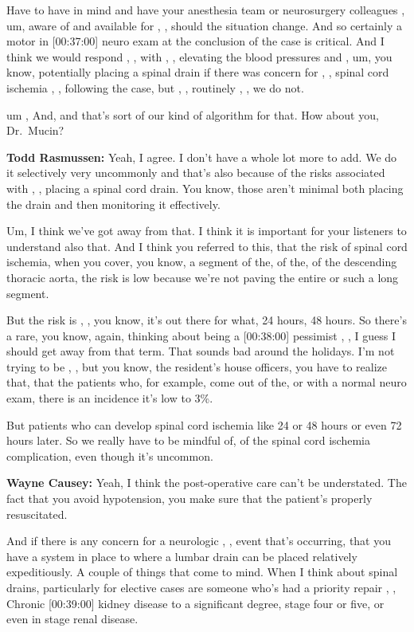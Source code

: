 \documentclass[
]{book}
\begin{document}
Have to have in mind and have your anesthesia team or neurosurgery
colleagues , um, aware of and available for , , should the situation
change. And so certainly a motor in {[}00:37:00{]} neuro exam at the
conclusion of the case is critical. And I think we would respond , ,
with , , elevating the blood pressures and , um, you know, potentially
placing a spinal drain if there was concern for , , spinal cord ischemia
, , following the case, but , , routinely , , we do not.

um , And, and that's sort of our kind of algorithm for that. How about
you, Dr.~Mucin?

\textbf{Todd Rasmussen:} Yeah, I agree. I don't have a whole lot more to add.
We do it selectively very uncommonly and that's also because of the
risks associated with , , placing a spinal cord drain. You know, those
aren't minimal both placing the drain and then monitoring it
effectively.

Um, I think we've got away from that. I think it is important for your
listeners to understand also that. And I think you referred to this,
that the risk of spinal cord ischemia, when you cover, you know, a
segment of the, of the, of the descending thoracic aorta, the risk is
low because we're not paving the entire or such a long segment.

But the risk is , , you know, it's out there for what, 24 hours, 48
hours. So there's a rare, you know, again, thinking about being a
{[}00:38:00{]} pessimist , , I guess I should get away from that term. That
sounds bad around the holidays. I'm not trying to be , , but you know,
the resident's house officers, you have to realize that, that the
patients who, for example, come out of the, or with a normal neuro exam,
there is an incidence it's low to 3\%.

But patients who can develop spinal cord ischemia like 24 or 48 hours or
even 72 hours later. So we really have to be mindful of, of the spinal
cord ischemia complication, even though it's uncommon.

\textbf{Wayne Causey:} Yeah, I think the post-operative care can't be
understated. The fact that you avoid hypotension, you make sure that the
patient's properly resuscitated.

And if there is any concern for a neurologic , , event that's occurring,
that you have a system in place to where a lumbar drain can be placed
relatively expeditiously. A couple of things that come to mind. When I
think about spinal drains, particularly for elective cases are someone
who's had a priority repair , , Chronic {[}00:39:00{]} kidney disease to a
significant degree, stage four or five, or even in stage renal disease.
\end{document}
